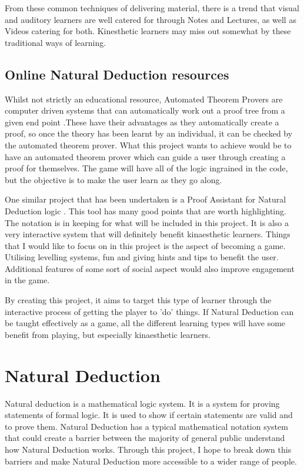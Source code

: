 \documentclass[a4paper]{article}
\begin{document}
From these common techniques of delivering material, there is a trend that visual and auditory learners are well catered for through Notes and Lectures, as well as Videos catering for both. Kinesthetic learners may miss out somewhat by these traditional ways of learning.


\subsection{Online Natural Deduction resources}

Whilst not strictly an educational resource, Automated Theorem Provers are computer driven systems that can automatically work out a proof tree from a given end point \cite{automated}.These have their advantages as they automatically create a proof, so once the theory has been learnt by an individual, it can be checked by the automated theorem prover. What this project wants to achieve would be to have an automated theorem prover which can guide a user through creating a proof for themselves. The game will have all of the logic ingrained in the code, but the objective is to make the user learn as they go along. 

One similar project that has been undertaken is a Proof Assistant for Natural Deduction logic \cite{gasquet2011panda}. This tool has many good points that are worth highlighting. The notation is in keeping for what will be included in this project. It is also a very interactive system that will definitely benefit kinaesthetic learners. Things that I would like to focus on in this project is the aspect of becoming a game. Utilising levelling systems, fun and giving hints and tips to benefit the user. Additional features of some sort of social aspect would also improve engagement in the game.

By creating this project, it aims to target this type of learner through the interactive process of getting the player to 'do' things. If Natural Deduction can be taught effectively as a game, all the different learning types will have some benefit from playing, but especially kinaesthetic learners.

\section{Natural Deduction}

Natural deduction is a mathematical logic system. It is a system for proving statements of formal logic. It is used to show if certain statements are valid and to prove them. \cite{BriefHistory} Natural Deduction has a typical mathematical notation system that could create a barrier between the majority of general public understand how Natural Deduction works. Through this project, I hope to break down this barriers and make Natural Deduction more accessible to a wider range of people. 
\end{document}
